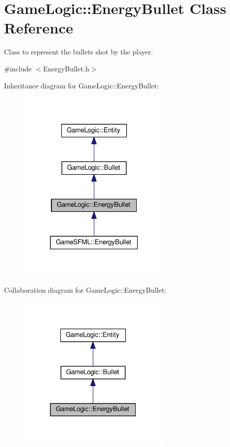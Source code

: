 \hypertarget{classGameLogic_1_1EnergyBullet}{}\section{Game\+Logic\+:\+:Energy\+Bullet Class Reference}
\label{classGameLogic_1_1EnergyBullet}


Class to represent the bullets shot by the player.  




{\ttfamily \#include $<$Energy\+Bullet.\+h$>$}



Inheritance diagram for Game\+Logic\+:\+:Energy\+Bullet\+:
\nopagebreak
\begin{figure}[H]
\begin{center}
\leavevmode
\includegraphics[width=211pt]{classGameLogic_1_1EnergyBullet__inherit__graph}
\end{center}
\end{figure}


Collaboration diagram for Game\+Logic\+:\+:Energy\+Bullet\+:\nopagebreak
\begin{figure}[H]
\begin{center}
\leavevmode
\includegraphics[width=208pt]{classGameLogic_1_1EnergyBullet__coll__graph}
\end{center}
\end{figure}
